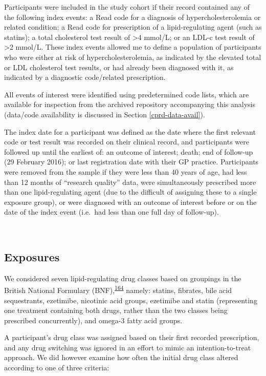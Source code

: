 \documentclass[a4paper, twoside]{templates/ociamthesis}
\begin{document}
Participants were included in the study cohort if their record contained any of the following index events: a Read code for a diagnosis of hypercholesterolemia or related condition; a Read code for prescription of a lipid-regulating agent (such as statins); a total cholesterol test result of \textgreater4 mmol/L; or an LDL-c test result of \textgreater2 mmol/L. These index events allowed me to define a population of participants who were either at risk of hypercholesterolemia, as indicated by the elevated total or LDL cholesterol test results, or had already been diagnosed with it, as indicated by a diagnostic code/related prescription.

All events of interest were identified using predetermined code lists, which are available for inspection from the archived repository accompanying this analysis (data/code availability is discussed in Section \ref{cprd-data-avail}).

The index date for a participant was defined as the date where the first relevant code or test result was recorded on their clinical record, and participants were followed up until the earliest of: an outcome of interest; death; end of follow-up (29 February 2016); or last registration date with their GP practice. Participants were removed from the sample if they were less than 40 years of age, had less than 12 months of ``research quality'' data, were simultaneously prescribed more than one lipid-regulating agent (due to the difficult of assigning these to a single exposure group), or were diagnosed with an outcome of interest before or on the date of the index event (i.e.~had less than one full day of follow-up).

~

\hypertarget{exposures}{%
\subsection{Exposures}\label{exposures}}

We considered seven lipid-regulating drug classes based on groupings in the British National Formulary (BNF),\textsuperscript{\protect\hyperlink{ref-wishart2017}{164}} namely: statins, fibrates, bile acid sequestrants, ezetimibe, nicotinic acid groups, ezetimibe and statin (representing one treatment containing both drugs, rather than the two classes being prescribed concurrently), and omega-3 fatty acid groups.

A participant's drug class was assigned based on their first recorded prescription, and any drug switching was ignored in an effort to mimic an intention-to-treat approach. We did however examine how often the initial drug class altered according to one of three criteria:
\end{document}
